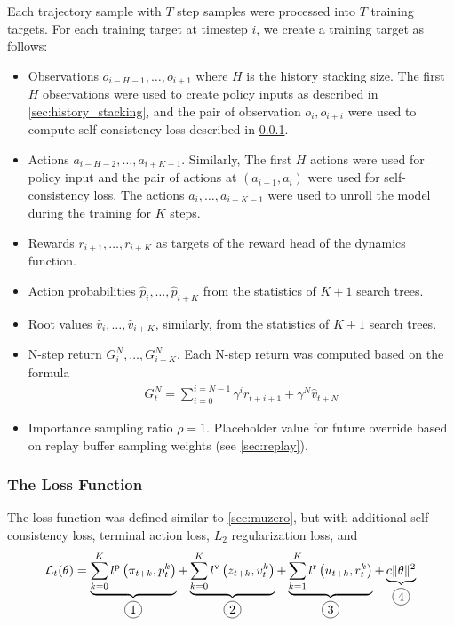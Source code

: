 \documentclass[12pt]{article}
\newcommand*\circled[1]{\tikz[baseline=(char.base)]{
            \node[shape=circle,draw,inner sep=2pt] (char) {#1};}}
\begin{document}
Each trajectory sample with $T$ step samples were processed into $T$ training targets.
For each training target at timestep $i$, we create a training target as follows:
\begin{itemize}
    \item Observations $o_{i - H - 1}, \dots, o_{i + 1}$ where $H$ is the history stacking size.
          The first $H$ observations were used to create policy inputs as described in \ref{sec:history_stacking},
          and the pair of observation $o_{i}, o_{i+i}$ were used to compute self-consistency loss described in \ref{sec:loss}.

    \item Actions $a_{i - H - 2}, \dots, a_{i + K - 1}$.
          Similarly, The first $H$ actions were used for policy input and the pair of actions at $(a_{i - 1}, a_{i})$ were used for self-consistency loss.
          The actions $a_{i}, \dots, a_{i + K - 1}$ were used to unroll the model during the training for $K$ steps.

    \item Rewards $r_{i + 1}, \dots, r_{i + K}$ as targets of the reward head of the dynamics function.

    \item Action probabilities $\hat{p}_{i}, \dots, \hat{p}_{i + K}$ from the statistics of $K + 1$ search trees.

    \item Root values $\hat{v}_i, \dots, \hat{v}_{i + K}$, similarly, from the statistics of $K + 1$ search trees.

    \item N-step return $G^N_{i}, \dots, G^N_{i + K}$.
          Each N-step return was computed based on the formula
          \begin{align*}
              G^N_{t} = \sum_{i = 0}^{i = N - 1}{\gamma^i r_{t+i+1}} + \gamma^N\hat{v}_{t + N}
          \end{align*}

    \item Importance sampling ratio $\rho = 1$. Placeholder value for future override based on replay buffer sampling weights (see \ref{sec:replay}).
\end{itemize}

\subsubsection{The Loss Function} \label{sec:loss}
The loss function was defined similar to \ref{sec:muzero}, but with additional self-consistency loss, terminal action loss, $L_2$ regularization loss, and
\begin{equation}
    \mathcal{L}_{t}(\theta)=
    \underbrace{\sum_{k=0}^{K} l^{\mathrm{p}}\left(\pi_{t+k}, p_{t}^{k}\right)}_{\circled{1}}
    +
    \underbrace{\sum_{k=0}^{K} l^{\mathrm{v}}\left(z_{t+k}, v_{t}^{k}\right)}_{\circled{2}}
    +
    \underbrace{\sum_{k=1}^{K} l^{\mathrm{r}}\left(u_{t+k}, r_{t}^{k}\right)}_{\circled{3}}
    +
    \underbrace{c\|\theta\|^{2}}_{\circled{4}}
\end{equation}
\end{document}
